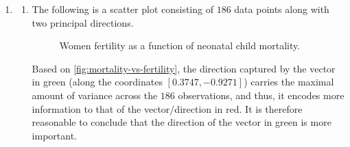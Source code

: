 \documentclass{article}
\begin{document}
\begin{enumerate}[leftmargin={*}, font={\bf}, label={\arabic*.}, ref={\arabic*}]
  \item \label{qst:1}
    \begin{enumerate}[label={(\roman*)}, ref={\theenumi(\roman*)}]
      \item \label{qst:1i}
        The following is a scatter plot consisting of $186$ data points along with
        two principal directions.
        \begin{figure}[H]
          \centering
          \caption{
            Women fertility as a function of neonatal child mortality.
          }
          \label{fig:mortality-vs-fertility}
        \end{figure}
        Based on \autoref{fig:mortality-vs-fertility}, the direction captured by
        the vector in green (along the coordinates $\left[0.3747, -0.9271\right]$)
        carries the maximal amount of variance across the $186$ observations, and
        thus, it encodes more information to that of the vector/direction in red.
        It is therefore reasonable to conclude that the direction of the vector in
        green is more important.
        

\end{enumerate}
\end{enumerate}
\end{document}
